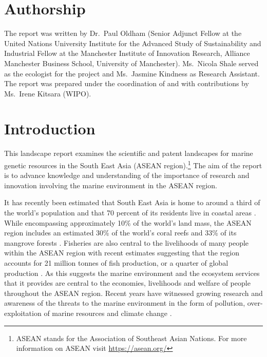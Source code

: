 \documentclass[openany]{book}
\let\rmarkdownfootnote\footnote%
\def\footnote{\protect\rmarkdownfootnote}
\theoremstyle{definition}
\theoremstyle{definition}
\theoremstyle{definition}
\theoremstyle{remark}
\begin{document}
\hypertarget{authorship}{%
\chapter*{Authorship}\label{authorship}}

The report was written by Dr.~Paul Oldham (Senior Adjunct Fellow at the
United Nations University Institute for the Advanced Study of
Sustainability and Industrial Fellow at the Manchester Institute of
Innovation Research, Alliance Manchester Business School, University of
Manchester). Ms.~Nicola Shale served as the ecologist for the project
and Ms.~Jasmine Kindness as Research Assistant. The report was prepared
under the coordination of and with contributions by Ms.~Irene Kitsara
(WIPO).

\hypertarget{intro}{%
\chapter{Introduction}\label{intro}}

This landscape report examines the scientific and patent landscapes for
marine genetic resources in the South East Asia (ASEAN
region).\footnote{ASEAN stands for the Association of Southeast Asian
  Nations. For more information on ASEAN visit \url{https://asean.org/}}
The aim of the report is to advance knowledge and understanding of the
importance of research and innovation involving the marine environment
in the ASEAN region.

It has recently been estimated that South East Asia is home to around a
third of the world's population and that 70 percent of its residents
live in coastal areas \citep[Olewiler in][]{Marine_2016}. While
encompassing approximately 10\% of the world's land mass, the ASEAN
region includes an estimated 30\% of the world's coral reefs and 33\% of
its mangrove forests \citep{Marine_2016}. Fisheries are also central to
the livelihoods of many people within the ASEAN region with recent
estimates suggesting that the region accounts for 21 million tonnes of
fish production, or a quarter of global production \citep[Ferrer
in][]{Marine_2016}. As this suggests the marine environment and the
ecosystem services that it provides are central to the economies,
livelihoods and welfare of people throughout the ASEAN region. Recent
years have witnessed growing research and awareness of the threats to
the marine environment in the form of pollution, over-exploitation of
marine resources and climate change \citep{Marine_2016}.
\end{document}
